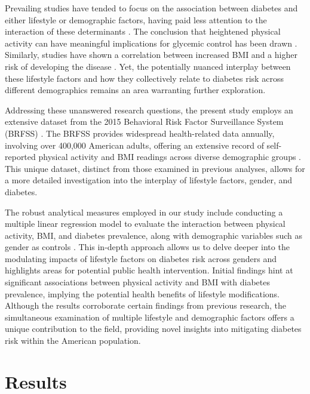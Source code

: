 \documentclass[11pt]{article}
\begin{document}
Prevailing studies have tended to focus on the association between diabetes and either lifestyle or demographic factors, having paid less attention to the interaction of these determinants \cite{Pham2019EthnicDI,Gustavsson2014FTOGP}. The conclusion that heightened physical activity can have meaningful implications for glycemic control has been drawn \cite{Bohn2015ImpactOP, Kanaley2022ExercisePhysicalAI}. Similarly, studies have shown a correlation between increased BMI and a higher risk of developing the disease \cite{Chen2018AssociationOB, Logue2013AssociationBB}. Yet, the potentially nuanced interplay between these lifestyle factors and how they collectively relate to diabetes risk across different demographics remains an area warranting further exploration.

Addressing these unanswered research questions, the present study employs an extensive dataset from the 2015 Behavioral Risk Factor Surveillance System (BRFSS) \cite{Heslin2021SexualOD}. The BRFSS provides widespread health-related data annually, involving over 400,000 American adults, offering an extensive record of self-reported physical activity and BMI readings across diverse demographic groups \cite{Aiello2019LargescaleAH, Davis2010StateBasedEO}. This unique dataset, distinct from those examined in previous analyses, allows for a more detailed investigation into the interplay of lifestyle factors, gender, and diabetes.

The robust analytical measures employed in our study include conducting a multiple linear regression model to evaluate the interaction between physical activity, BMI, and diabetes prevalence, along with demographic variables such as gender as controls \cite{Aune2015PhysicalAA, Li2015ParsimoniousTR}. This in-depth approach allows us to delve deeper into the modulating impacts of lifestyle factors on diabetes risk across genders and highlights areas for potential public health intervention. Initial findings hint at significant associations between physical activity and BMI with diabetes prevalence, implying the potential health benefits of lifestyle modifications. Although the results corroborate certain findings from previous research, the simultaneous examination of multiple lifestyle and demographic factors offers a unique contribution to the field, providing novel insights into mitigating diabetes risk within the American population.

\section*{Results}
\end{document}
